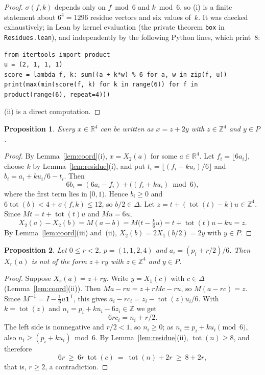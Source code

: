 \documentclass[11pt]{article}
\newtheorem{proposition}{Proposition}
\theoremstyle{definition}
\theoremstyle{remark}
\newcommand{\R}{\mathbb R}
\newcommand{\Z}{\mathbb Z}
\newcommand{\one}{\mathbf 1}
\newcommand{\tot}{\operatorname{tot}}
\begin{document}
\begin{proof}
$\sigma(f,k)$ depends only on $f\bmod 6$ and $k\bmod6$, so (i) is a finite
statement about $6^4=1296$ residue vectors and six values of~$k$. It was
checked exhaustively; in Lean by kernel evaluation (the private theorem \texttt{box} in
\texttt{Residues.lean}),
and independently by the following Python lines, which print~$8$:
{\footnotesize
\begin{verbatim}
from itertools import product
u = (2, 1, 1, 1)
score = lambda f, k: sum((a + k*w) % 6 for a, w in zip(f, u))
print(max(min(score(f, k) for k in range(6)) for f in product(range(6), repeat=4)))
\end{verbatim}}
\noindent (ii) is a direct computation.
\end{proof}

\begin{proposition}\label{prop:upper}
Every $x\in\R^4$ can be written as $x=z+2y$ with $z\in\Z^4$ and $y\in P$.
\end{proposition}

\begin{proof}
By Lemma~\ref{lem:coord}(i), $x=X_2(a)$ for some $a\in\R^4$. Let
$f_i=\lfloor6a_i\rfloor$, choose $k$ by Lemma~\ref{lem:residue}(i), and put
$t_i=\lfloor(f_i+ku_i)/6\rfloor$ and $b_i=a_i+ku_i/6-t_i$. Then
\[
6b_i=(6a_i-f_i)+\bigl((f_i+ku_i)\bmod6\bigr),
\]
where the first term lies in $[0,1)$. Hence $b_i\ge0$ and
$6\tot(b)<4+\sigma(f,k)\le12$, so $b/2\in\Delta$. Let
$z=t+(\tot(t)-k)u\in\Z^4$. Since $Mt=t+\tot(t)u$ and $Mu=6u$,
\[
X_2(a)-X_2(b)=M(a-b)=M\bigl(t-\tfrac k6u\bigr)=t+\tot(t)u-ku=z .
\]
By Lemma~\ref{lem:coord}(iii) and~(ii), $X_2(b)=2X_1(b/2)=2y$ with $y\in P$.
\end{proof}

\begin{proposition}\label{prop:lower}
Let $0\le r<2$, $p=(1,1,2,4)$ and $a_i=(p_i+r/2)/6$. Then $X_r(a)$ is not of
the form $z+ry$ with $z\in\Z^4$ and $y\in P$.
\end{proposition}

\begin{proof}
Suppose $X_r(a)=z+ry$. Write $y=X_1(c)$ with $c\in\Delta$
(Lemma~\ref{lem:coord}(ii)). Then $Ma-ru=z+rMc-ru$, so $M(a-rc)=z$. Since
$M^{-1}=I-\frac16u\one^{\mathsf T}$, this gives
$a_i-rc_i=z_i-\tot(z)u_i/6$. With $k=\tot(z)$ and $n_i=p_i+ku_i-6z_i\in\Z$ we get
\[
6rc_i=n_i+r/2 .
\]
The left side is nonnegative and $r/2<1$, so $n_i\ge0$; as
$n_i\equiv p_i+ku_i\pmod6$, also $n_i\ge(p_i+ku_i)\bmod6$. By
Lemma~\ref{lem:residue}(ii), $\tot(n)\ge8$, and therefore
\[
6r\ \ge\ 6r\,\tot(c)\ =\ \tot(n)+2r\ \ge\ 8+2r,
\]
that is, $r\ge2$, a contradiction.
\end{proof}
\end{document}
